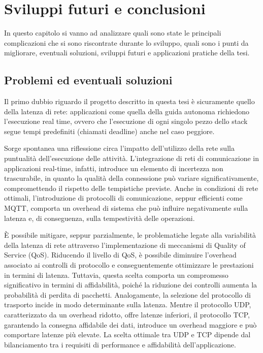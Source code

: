 \chapter{Sviluppi futuri e conclusioni}
In questo capitolo si vanno ad analizzare quali sono state le principali complicazioni che si sono riscontrate durante lo sviluppo, quali sono i punti da migliorare, eventuali soluzioni, sviluppi futuri e applicazioni pratiche della tesi.

\section{Problemi ed eventuali soluzioni}
Il primo dubbio riguardo il progetto descritto in questa tesi è sicuramente quello della latenza di rete: applicazioni come quella della guida autonoma richiedono l'esecuzione real time, ovvero che l'esecuzione di ogni singolo pezzo dello stack segue tempi predefiniti (chiamati deadline) anche nel caso peggiore.  

\noindent Sorge spontanea una riflessione circa l'impatto dell'utilizzo della rete sulla puntualità dell'esecuzione delle attività. L'integrazione di reti di comunicazione in applicazioni real-time, infatti, introduce un elemento di incertezza non trascurabile, in quanto la qualità della connessione può variare significativamente, compromettendo il rispetto delle tempistiche previste. Anche in condizioni di rete ottimali, l'introduzione di protocolli di comunicazione, seppur efficienti come MQTT, comporta un overhead di sistema che può influire negativamente sulla latenza e, di conseguenza, sulla tempestività delle operazioni.

\noindent È possibile mitigare, seppur parzialmente, le problematiche legate alla variabilità della latenza di rete attraverso l'implementazione di meccanismi di Quality of Service (QoS). Riducendo il livello di QoS, è possibile diminuire l'overhead associato ai controlli di protocollo e conseguentemente ottimizzare le prestazioni in termini di latenza. Tuttavia, questa scelta comporta un compromesso significativo in termini di affidabilità, poiché la riduzione dei controlli aumenta la probabilità di perdita di pacchetti. Analogamente, la selezione del protocollo di trasporto incide in modo determinante sulla latenza. Mentre il protocollo UDP, caratterizzato da un overhead ridotto, offre latenze inferiori, il protocollo TCP, garantendo la consegna affidabile dei dati, introduce un overhead maggiore e può comportare latenze più elevate. La scelta ottimale tra UDP e TCP dipende dal bilanciamento tra i requisiti di performance e affidabilità dell'applicazione.

